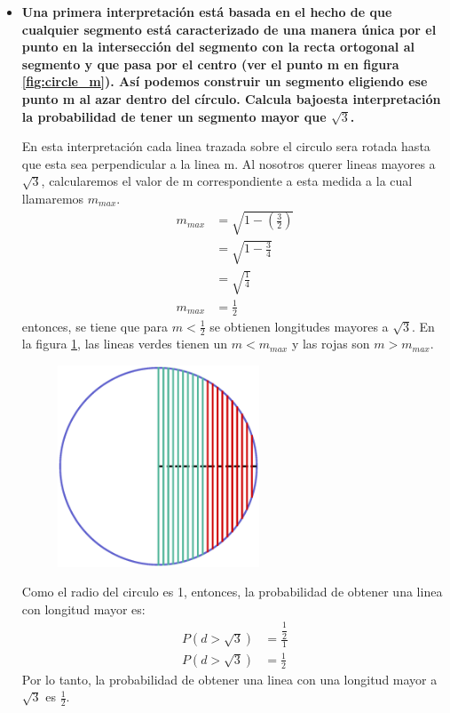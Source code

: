 \begin{itemize}
    \item \textbf{Una primera interpretación está basada en el hecho de que cualquier segmento está caracterizado de una manera única por el punto en la intersección del segmento con la recta ortogonal al segmento y que pasa por el centro (ver el punto m en figura \ref{fig:circle_m}). Así podemos construir un segmento eligiendo ese punto m al azar dentro del círculo. Calcula bajoesta interpretación la probabilidad de tener un segmento mayor que $\sqrt{3}$.}

          En esta interpretación cada linea trazada sobre el circulo sera rotada hasta que esta sea perpendicular a la linea m. Al nosotros querer lineas mayores a $\sqrt{3}$, calcularemos el valor de m correspondiente a esta medida a la cual llamaremos $m_{max}$.
          \begin{align*}
              m_{max} & = \sqrt{1-\left(\frac{3}{2}\right)} \\
                      & = \sqrt{1-\frac{3}{4}}              \\
                      & = \sqrt{\frac{1}{4}}                \\
              m_{max} & = \frac{1}{2}
          \end{align*}
          entonces, se tiene que para $m<\frac{1}{2}$ se obtienen longitudes mayores a $\sqrt{3}$. En la figura \ref{fig:problema2_interpretacion1}, las lineas verdes tienen un $m<m_{max}$ y las rojas son $m>m_{max}$.
          \begin{figure}[H]
              \centering
              \includegraphics[width=6cm]{Graphics/circle_2.eps}
              \caption{}
              \label{fig:problema2_interpretacion1}
          \end{figure}
          Como el radio del circulo es 1, entonces, la probabilidad de obtener una linea con longitud mayor es:
          \begin{align*}
              P(d>\sqrt{3}) & = \frac{\dfrac{1}{2}}{1} \\
              P(d>\sqrt{3}) & = \frac{1}{2}
          \end{align*}
          Por lo tanto, la probabilidad de obtener una linea con una longitud mayor a $\sqrt{3}$ es $\frac{1}{2}$.
\end{itemize}

